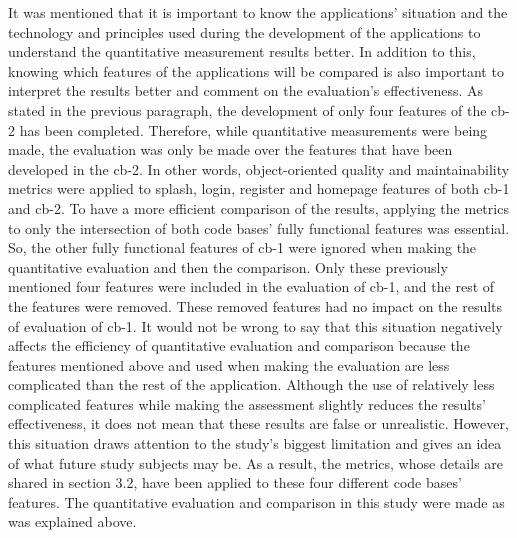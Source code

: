 It was mentioned that it is important to know the applications' situation and the technology and principles used during the development of the applications to understand the quantitative measurement results better. In addition to this, knowing which features of the applications will be compared is also important to interpret the results better and comment on the evaluation's effectiveness. As stated in the previous paragraph, the development of only four features of the cb-2 has been completed. Therefore, while quantitative measurements were being made, the evaluation was only be made over the features that have been developed in the cb-2. In other words, object-oriented quality and maintainability metrics were applied to splash, login, register and homepage features of both cb-1 and cb-2. To have a more efficient comparison of the results, applying the metrics to only the intersection of both code bases' fully functional features was essential. So, the other fully functional features of cb-1 were ignored when making the quantitative evaluation and then the comparison. Only these previously mentioned four features were included in the evaluation of cb-1, and the rest of the features were removed. These removed features had no impact on the results of evaluation of cb-1. It would not be wrong to say that this situation negatively affects the efficiency of quantitative evaluation and comparison because the features mentioned above and used when making the evaluation are less complicated than the rest of the application. Although the use of relatively less complicated features while making the assessment slightly reduces the results' effectiveness, it does not mean that these results are false or unrealistic. However, this situation draws attention to the study's biggest limitation and gives an idea of what future study subjects may be. As a result, the metrics, whose details are shared in section 3.2, have been applied to these four different code bases' features. The quantitative evaluation and comparison in this study were made as was explained above.